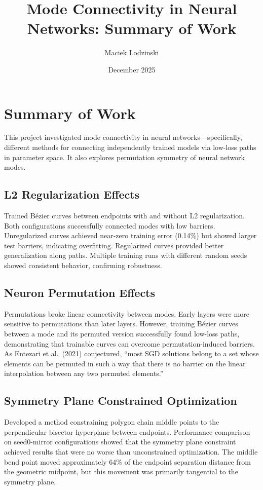 \documentclass[11pt,a4paper]{article}
\title{Mode Connectivity in Neural Networks: Summary of Work}
\author{Maciek Lodzinski}
\date{December 2025}
\begin{document}
\maketitle

\section{Summary of Work}
This project investigated mode connectivity in neural networks---specifically, different methods for connecting independently trained models via low-loss paths in parameter space. It also explores permutation symmetry of neural network modes.

\subsection{L2 Regularization Effects}
Trained B\'{e}zier curves between endpoints with and without L2 regularization. Both configurations successfully connected modes with low barriers. Unregularized curves achieved near-zero training error (0.14\%) but showed larger test barriers, indicating overfitting. Regularized curves provided better generalization along paths. Multiple training runs with different random seeds showed consistent behavior, confirming robustness.

\subsection{Neuron Permutation Effects}
Permutations broke linear connectivity between modes. Early layers were more sensitive to permutations than later layers. However, training B\'{e}zier curves between a mode and its permuted version successfully found low-loss paths, demonstrating that trainable curves can overcome permutation-induced barriers. As Entezari et al.\ (2021) conjectured, ``most SGD solutions belong to a set whose elements can be permuted in such a way that there is no barrier on the linear interpolation between any two permuted elements.''

\subsection{Symmetry Plane Constrained Optimization}
Developed a method constraining polygon chain middle points to the perpendicular bisector hyperplane between endpoints. Performance comparison on seed0-mirror configurations showed that the symmetry plane constraint achieved results that were no worse than unconstrained optimization. The middle bend point moved approximately 64\% of the endpoint separation distance from the geometric midpoint, but this movement was primarily tangential to the symmetry plane.
\end{document}
